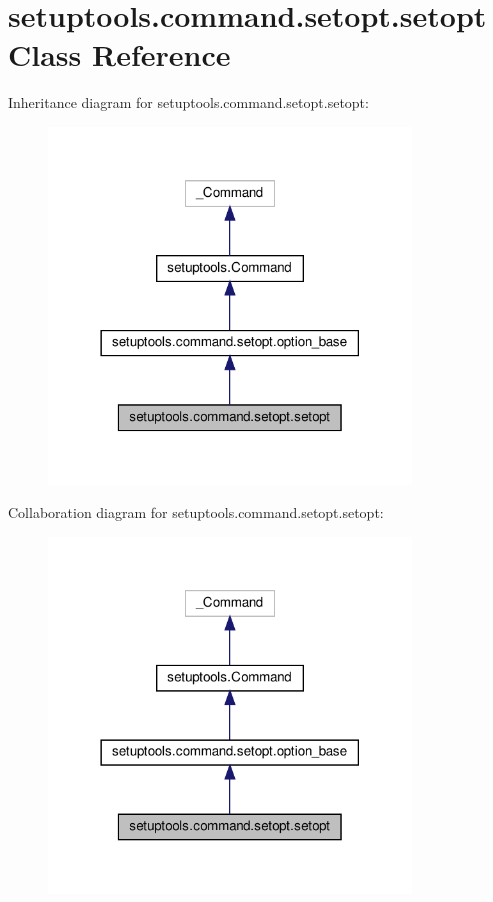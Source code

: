 \hypertarget{classsetuptools_1_1command_1_1setopt_1_1setopt}{}\section{setuptools.\+command.\+setopt.\+setopt Class Reference}
\label{classsetuptools_1_1command_1_1setopt_1_1setopt}


Inheritance diagram for setuptools.\+command.\+setopt.\+setopt\+:
\nopagebreak
\begin{figure}[H]
\begin{center}
\leavevmode
\includegraphics[width=273pt]{classsetuptools_1_1command_1_1setopt_1_1setopt__inherit__graph}
\end{center}
\end{figure}


Collaboration diagram for setuptools.\+command.\+setopt.\+setopt\+:
\nopagebreak
\begin{figure}[H]
\begin{center}
\leavevmode
\includegraphics[width=273pt]{classsetuptools_1_1command_1_1setopt_1_1setopt__coll__graph}
\end{center}
\end{figure}
